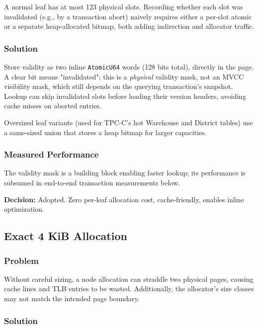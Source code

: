 \documentclass[11pt]{article}
\newcommand{\code}[1]{\texttt{#1}}
\begin{document}
A normal leaf has at most 123 physical slots. Recording whether each slot was invalidated
(e.g., by a transaction abort) naively requires either a per-slot atomic or a separate
heap-allocated bitmap, both adding indirection and allocator traffic.

\subsubsection{Solution}

Store validity as two inline \code{AtomicU64} words (128 bits total), directly in the page.
A clear bit means "invalidated"; this is a \emph{physical} validity mask, not an MVCC
visibility mask, which still depends on the querying transaction's snapshot. Lookup can
skip invalidated slots before loading their version headers, avoiding cache misses on
aborted entries.

Oversized leaf variants (used for TPC-C's hot Warehouse and District tables) use a same-sized
union that stores a heap bitmap for larger capacities.

\subsubsection{Measured Performance}

The validity mask is a building block enabling faster lookup; its performance is subsumed
in end-to-end transaction measurements below.

\textbf{Decision:} Adopted. Zero per-leaf allocation cost, cache-friendly, enables inline
optimization.

\subsection{Exact 4 KiB Allocation}

\subsubsection{Problem}

Without careful sizing, a node allocation can straddle two physical pages, causing cache
lines and TLB entries to be wasted. Additionally, the allocator's size classes may not match
the intended page boundary.

\subsubsection{Solution}
\end{document}
